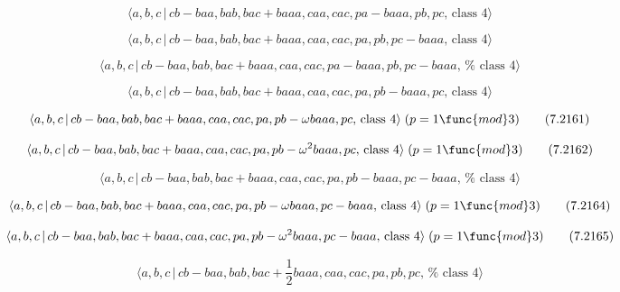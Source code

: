 \documentclass[10pt]{article}
\begin{document}
\begin{equation}
\langle a,b,c\,|\,cb-baa,bab,bac+baaa,caa,cac,pa-baaa,pb,pc,\,\text{class }%
4\rangle  \tag{7.2157}
\end{equation}

\begin{equation}
\langle a,b,c\,|\,cb-baa,bab,bac+baaa,caa,cac,pa,pb,pc-baaa,\,\text{class }%
4\rangle  \tag{7.2158}
\end{equation}

\begin{equation}
\langle a,b,c\,|\,cb-baa,bab,bac+baaa,caa,cac,pa-baaa,pb,pc-baaa,\,\text{%
class }4\rangle  \tag{7.2159}
\end{equation}

\begin{equation}
\langle a,b,c\,|\,cb-baa,bab,bac+baaa,caa,cac,pa,pb-baaa,pc,\,\text{class }%
4\rangle  \tag{7.2160}
\end{equation}

\begin{equation}
\langle a,b,c\,|\,cb-baa,bab,bac+baaa,caa,cac,pa,pb-\omega baaa,pc,\,\text{%
class }4\rangle \;(p=1\func{mod}3)  \tag{7.2161}
\end{equation}

\begin{equation}
\langle a,b,c\,|\,cb-baa,bab,bac+baaa,caa,cac,pa,pb-\omega ^{2}baaa,pc,\,%
\text{class }4\rangle \;(p=1\func{mod}3)  \tag{7.2162}
\end{equation}

\begin{equation}
\langle a,b,c\,|\,cb-baa,bab,bac+baaa,caa,cac,pa,pb-baaa,pc-baaa,\,\text{%
class }4\rangle  \tag{7.2163}
\end{equation}

\begin{equation}
\langle a,b,c\,|\,cb-baa,bab,bac+baaa,caa,cac,pa,pb-\omega baaa,pc-baaa,\,%
\text{class }4\rangle \;(p=1\func{mod}3)  \tag{7.2164}
\end{equation}

\begin{equation}
\langle a,b,c\,|\,cb-baa,bab,bac+baaa,caa,cac,pa,pb-\omega
^{2}baaa,pc-baaa,\,\text{class }4\rangle \;(p=1\func{mod}3)  \tag{7.2165}
\end{equation}

\begin{equation}
\langle a,b,c\,|\,cb-baa,bab,bac+\frac{1}{2}baaa,caa,cac,pa,pb,pc,\,\text{%
class }4\rangle  \tag{7.2166}
\end{equation}
\end{document}
